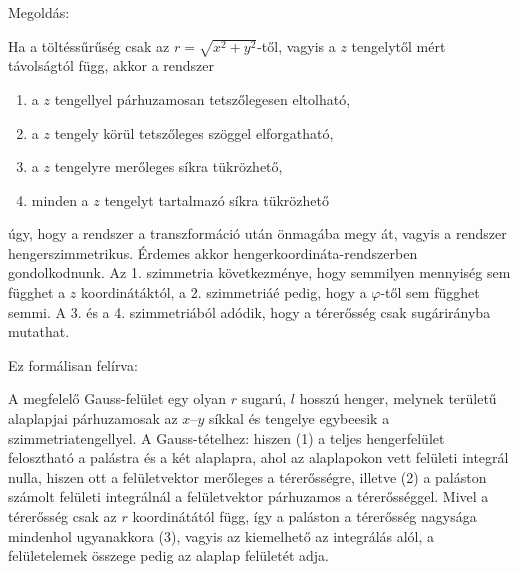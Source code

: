 
\ifdefined\megoldas
   

 Megoldás: 

 Ha a töltéssűrűség csak az $r=\sqrt{x^2+y^2}$-től, vagyis a $z$ tengelytől mért távolságtól függ, akkor a rendszer 
 \begin{enumerate}[itemsep=0pt]
  \item a $z$ tengellyel párhuzamosan tetszőlegesen eltolható,
  \item a $z$ tengely körül tetszőleges szöggel elforgatható,
  \item a $z$ tengelyre merőleges síkra tükrözhető,
  \item minden a $z$ tengelyt tartalmazó síkra tükrözhető
 \end{enumerate}
 úgy, hogy a rendszer a transzformáció után önmagába megy át, vagyis a rendszer hengerszimmetrikus. Érdemes akkor hengerkoordináta-rendszerben gondolkodnunk. Az 1. szimmetria következménye, hogy semmilyen mennyiség sem függhet a $z$ koordinátáktól, a 2. szimmetriáé pedig, hogy a $\varphi$-től sem függhet semmi. A 3. és a 4. szimmetriából adódik, hogy a térerősség  csak sugárirányba mutathat. 

 Ez formálisan felírva:

 A megfelelő Gauss-felület egy olyan $r$ sugarú, $l$ hosszú henger, melynek területű alaplapjai párhuzamosak az $x$--$y$ síkkal és tengelye egybeesik a szimmetriatengellyel. A Gauss-tételhez:
 hiszen (1) a teljes hengerfelület felosztható a palástra és a két alaplapra, ahol az alaplapokon vett felületi integrál nulla, hiszen ott a felületvektor merőleges a térerősségre, illetve (2) a paláston számolt felületi integrálnál a felületvektor párhuzamos a térerősséggel. Mivel a térerősség csak az $r$ koordinátától függ, így a paláston a térerősség nagysága mindenhol ugyanakkora (3), vagyis az kiemelhető az integrálás alól, a felületelemek összege pedig az alaplap felületét adja.

